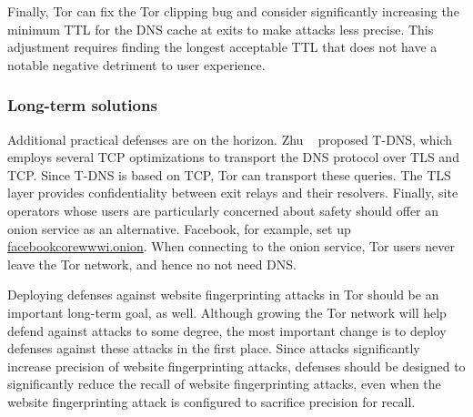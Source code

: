 Finally, Tor can fix the Tor clipping bug and consider significantly increasing the
minimum TTL for the DNS cache at exits to make \name attacks less precise.
This adjustment requires finding the longest acceptable TTL that does not have a
notable negative detriment to user experience.

\subsubsection{Long-term solutions}
\label{sec:long-term}

Additional practical defenses are on the horizon.  Zhu \ea~\cite{Zhu2015a} proposed
T-DNS, which employs several TCP optimizations to transport the DNS protocol
over TLS and TCP.  Since T-DNS is based on TCP, Tor can transport these queries.
The TLS layer provides confidentiality between exit relays and their resolvers.
Finally, site operators whose users are particularly concerned about
safety should offer an onion service as an alternative.  Facebook, for example,
set up \url{facebookcorewwwi.onion}.  When
connecting to the onion service, Tor users never leave the Tor network, and
hence no not need DNS.

Deploying defenses against website fingerprinting attacks in Tor should be an
important long-term goal, as well.
Although growing the Tor network will help defend against \name attacks to some
degree, the most important change is to
deploy defenses against these attacks in the first place.  Since \name attacks
significantly increase precision of website fingerprinting attacks, defenses
should be designed to significantly reduce the recall of website fingerprinting
attacks, even when the website fingerprinting attack is configured to sacrifice
precision for recall.
